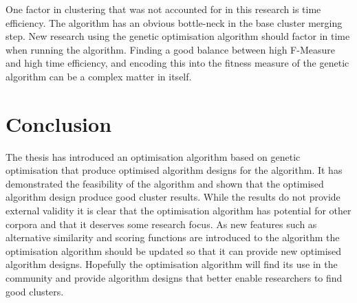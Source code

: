 One factor in clustering that was not accounted for in this research is time efficiency. The \CTC algorithm has an obvious bottle-neck in the base cluster merging step. New research using the genetic optimisation algorithm should factor in time when running the algorithm. Finding a good balance between high F-Measure and high time efficiency, and encoding this into the fitness measure of the genetic algorithm can be a complex matter in itself.

\section{Conclusion}
The thesis has introduced an optimisation algorithm based on genetic optimisation that produce optimised algorithm designs for the \CTC algorithm. It has demonstrated the feasibility of the algorithm and shown that the optimised algorithm design produce good cluster results. While the results do not provide external validity it is clear that the optimisation algorithm has potential for other corpora and that it deserves some research focus. As new features such as alternative similarity and scoring functions are introduced to the \CTC algorithm the optimisation algorithm should be updated so that it can provide new optimised algorithm designs. Hopefully the optimisation algorithm will find its use in the community and provide algorithm designs that better enable researchers to find good clusters.